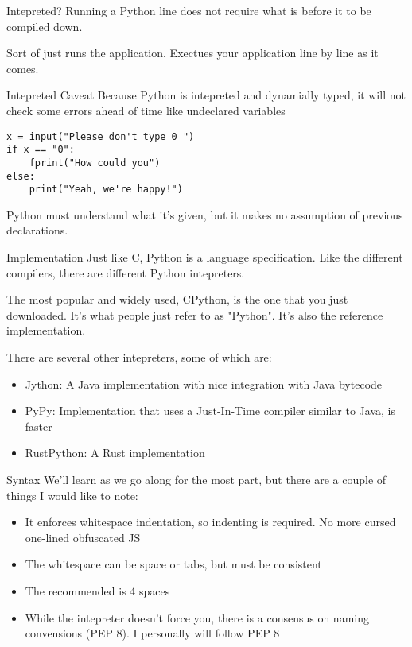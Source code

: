 \begin{frame}{Intepreted?}
    Running a Python line does not require what is before it to be compiled down.

    Sort of just runs the application. Exectues your application line by line as it comes.
\end{frame}

\begin{frame}[containsverbatim]{Intepreted Caveat}
    Because Python is intepreted and dynamially typed, it will not check some errors ahead of time like undeclared variables

    \begin{verbatim}
x = input("Please don't type 0 ")
if x == "0":
    fprint("How could you")
else:
    print("Yeah, we're happy!")
    \end{verbatim}

    Python must understand what it's given, but it makes no assumption of previous declarations.
\end{frame}

\begin{frame}{Implementation}
    Just like C, Python is a language specification. Like the different compilers, there are different Python intepreters.

    The most popular and widely used, CPython, is the one that you just downloaded. It's what people just refer to as "Python". It's also the reference implementation.

    There are several other intepreters, some of which are:
    \begin{itemize}
        \item Jython: A Java implementation with nice integration with Java bytecode
        \item PyPy: Implementation that uses a Just-In-Time compiler similar to Java, is faster
        \item RustPython: A Rust implementation
    \end{itemize}
\end{frame}

\begin{frame}{Syntax}
    We'll learn as we go along for the most part, but there are a couple of things I would like to note:
    \begin{itemize}
        \item It enforces whitespace indentation, so indenting is required. No more cursed one-lined obfuscated JS
        \item The whitespace can be space or tabs, but must be consistent
        \item The recommended is 4 spaces
        \item While the intepreter doesn't force you, there is a consensus on naming convensions (PEP 8). I personally will follow PEP 8
    \end{itemize}
\end{frame}

